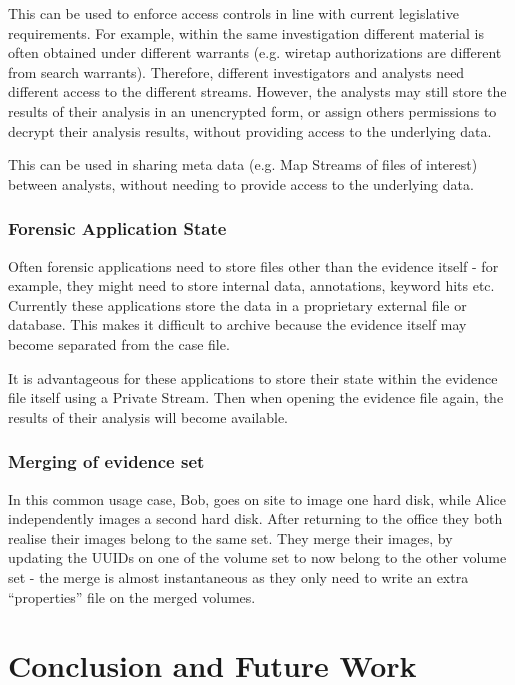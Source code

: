 \documentclass[10pt, conference]{IEEEtran}
\begin{document}
This can be used to enforce access controls in line with current
legislative requirements. For example, within the same investigation
different material is often obtained under different warrants
(e.g. wiretap authorizations are different from search
warrants). Therefore, different investigators and analysts need
different access to the different streams. However, the analysts may
still store the results of their analysis in an unencrypted form, or
assign others permissions to decrypt their analysis results, without
providing access to the underlying data. 

This can be used in sharing meta data (e.g. Map Streams of files of
interest) between analysts, without needing to provide access to the
underlying data.

\subsubsection{Forensic Application State}
Often forensic applications need to store files other than the
evidence itself - for example, they might need to store internal data,
annotations, keyword hits etc. Currently these applications store the
data in a proprietary external file or database. This makes it
difficult to archive because the evidence itself may become separated
from the case file.

It is advantageous for these applications to store their state within
the evidence file itself using a Private Stream. Then when opening the
evidence file again, the results of their analysis will become
available.

\subsubsection{Merging of evidence set}
In this common usage case, Bob, goes on site to image one hard disk,
while Alice independently images a second hard disk. After returning
to the office they both realise their images belong to the same
set. They merge their images, by updating the UUIDs on one of the
volume set to now belong to the other volume set - the merge is almost
instantaneous as they only need to write an extra ``properties'' file
on the merged volumes.

\section{Conclusion and Future Work}


\end{document}
